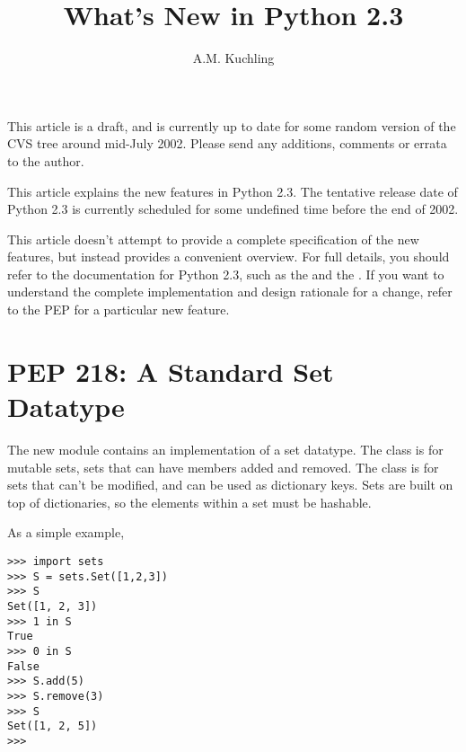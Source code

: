\documentclass{howto}
\title{What's New in Python 2.3}
\author{A.M. Kuchling}
\begin{document}
\maketitle
\tableofcontents

%
%
%


{\large This article is a draft, and is currently up to date for some
random version of the CVS tree around mid-July 2002.  Please send any
additions, comments or errata to the author.}

This article explains the new features in Python 2.3.  The tentative
release date of Python 2.3 is currently scheduled for some undefined
time before the end of 2002.

This article doesn't attempt to provide a complete specification of
the new features, but instead provides a convenient overview.  For
full details, you should refer to the documentation for Python 2.3,
such as the
 and the
.  If you want to understand the complete
implementation and design rationale for a change, refer to the PEP for
a particular new feature.


\section{PEP 218: A Standard Set Datatype}

The new  module contains an implementation of a set
datatype.  The  class is for mutable sets, sets that can
have members added and removed.  The  class is for
sets that can't be modified, and can be used as dictionary keys.  Sets
are built on top of dictionaries, so the elements within a set must be
hashable.

As a simple example, 

\begin{verbatim}
>>> import sets
>>> S = sets.Set([1,2,3])
>>> S
Set([1, 2, 3])
>>> 1 in S
True
>>> 0 in S
False
>>> S.add(5)
>>> S.remove(3)
>>> S
Set([1, 2, 5])
>>> 
\end{verbatim}
\end{document}
